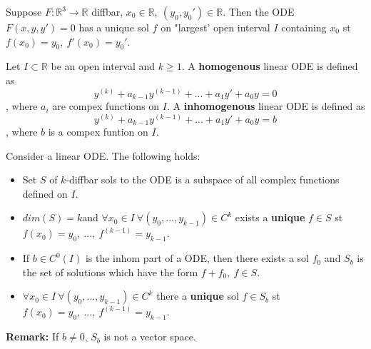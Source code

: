 \begin{theorem}
	Suppose $F: \mathbb{R}^3 \rightarrow \mathbb{R}$ diffbar, $x_0 \in \mathbb{R}, \  (y_0,y_0') \in \mathbb{R}$.
	Then the ODE $F(x,y,y') = 0$ has a unique sol $f$ on "largest' open interval $I$ containing $x_0$ st $f(x_0)= y_0, \ f'(x_0)=y_0'$.
\end{theorem}

\begin{definition}
	Let $I \subset \mathbb{R}$ be an open interval and $k \geq 1$. 
	A \textbf{homogenous} linear ODE is defined as
	$$ y^{(k)} + a_{k-1}y^{(k-1)} + ... + a_1y' + a_0y = 0 $$
	, where $a_i$ are compex functions on $I$.
	A \textbf{inhomogenous} linear ODE is defined as
	$$ y^{(k)} + a_{k-1}y^{(k-1)} + ... + a_1y' + a_0y = b$$
	, where $b$ is a compex funtion on $I$.
\end{definition}

\begin{theorem}
	Consider a linear ODE. The following holds:
	\begin{itemize}
		\item Set $S$ of $k$-diffbar sols to the ODE is a subspace of all complex functions defined on $I$.
		\item $dim(S)=k$and $\forall x_0 \in I \ \forall (y_0,...,y_{k-1}) \in C^k$ exists a \textbf{unique} $f\in S$ st $f(x_0) = y_0, \ ..., \ f^{(k-1)} = y_{k-1}$.
		\item If $b \in C^0(I)$ is the inhom part of a ODE, then there exists a sol $f_0$ and $S_b$ is the set of solutions which have the form $f + f_0, \ f \in S$.
		\item $\forall x_0 \in I \ \forall (y_0,...,y_{k-1}) \in C^k$ there a \textbf{unique} sol $f \in S_b$ st $f(x_0) = y_0, \ ..., \ f^{(k-1)} = y_{k-1}$.
	\end{itemize}
	\textbf{Remark:} If $b \neq 0$, $S_b$ is not a vector space. 
\end{theorem}


